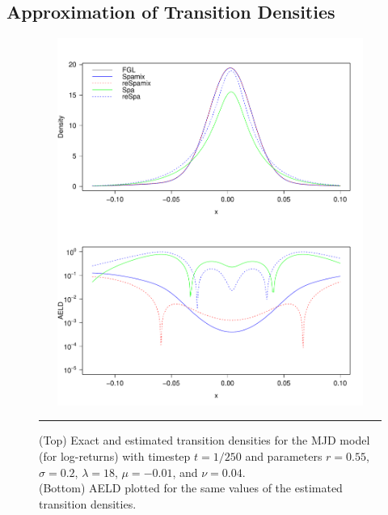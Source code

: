 \subsection{Approximation of Transition Densities}
\label{Chap6 sec: approximation of TD}


%

\begin{figure}[htbp]
	\centering
	\includegraphics[width=13cm,height=12cm]{./Figures/tdmjdreal.pdf}
	\rule{35em}{0.5pt}
	\caption[Transition densities: Merton jump-diffusion]{(Top) Exact and estimated transition densities for the MJD model (for log-returns) with timestep $t=1/250$ and parameters $r=0.55$, $\sigma=0.2$, $\lambda = 18$, $\mu=-0.01$, and $\nu=0.04$.\\
		(Bottom) AELD plotted for the same values of the estimated transition densities.}\label{fig: tdmjd1}
	\label{fig: tdmjd1}
\end{figure}

